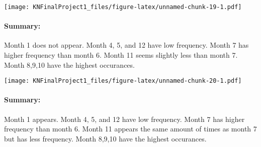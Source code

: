\documentclass[
]{article}
\newenvironment{Shaded}{\begin{snugshade}}{\end{snugshade}}
\newcommand{\DataTypeTok}[1]{\textcolor[rgb]{0.13,0.29,0.53}{#1}}
\newcommand{\DecValTok}[1]{\textcolor[rgb]{0.00,0.00,0.81}{#1}}
\newcommand{\KeywordTok}[1]{\textcolor[rgb]{0.13,0.29,0.53}{\textbf{#1}}}
\newcommand{\NormalTok}[1]{#1}
\newcommand{\OperatorTok}[1]{\textcolor[rgb]{0.81,0.36,0.00}{\textbf{#1}}}
\newcommand{\StringTok}[1]{\textcolor[rgb]{0.31,0.60,0.02}{#1}}
\begin{document}
\texttt{[image: KNFinalProject1\_files/figure-latex/unnamed-chunk-19-1.pdf]}

\hypertarget{summary-1}{%
\paragraph{Summary:}\label{summary-1}}

Month 1 does not appear. Month 4, 5, and 12 have low frequency. Month 7
has higher frequency than month 6. Month 11 seems slightly less than
month 7. Month 8,9,10 have the highest occurances.

\begin{Shaded}
\end{Shaded}

\texttt{[image: KNFinalProject1\_files/figure-latex/unnamed-chunk-20-1.pdf]}

\hypertarget{summary-2}{%
\paragraph{Summary:}\label{summary-2}}

Month 1 appears. Month 4, 5, and 12 have low frequency. Month 7 has
higher frequency than month 6. Month 11 appears the same amount of times
as month 7 but has less frequency. Month 8,9,10 have the highest
occurances.
\end{document}
